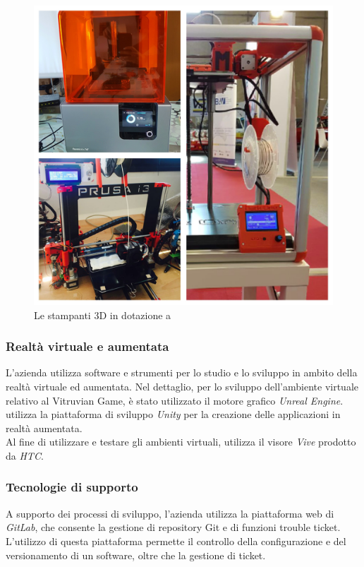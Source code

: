 \begin{figure}[H]
	\begin{center}
	\includegraphics[scale=0.07]{immagini/stampanti.jpg}
	\caption{Le stampanti 3D in dotazione a \lab{}}
	\end{center}
\end{figure}

\subsubsection{Realtà virtuale e aumentata}
L'azienda utilizza software e strumenti per lo studio e lo sviluppo in ambito della realtà virtuale ed aumentata.
Nel dettaglio, per lo sviluppo dell'ambiente virtuale relativo al Vitruvian Game, è stato utilizzato il motore grafico \textit{Unreal Engine}.\\
\lab{} utilizza la piattaforma di sviluppo \textit{Unity} per la creazione delle applicazioni in realtà aumentata.\\
Al fine di utilizzare e testare gli ambienti virtuali, \lab{} utilizza il visore \textit{Vive} prodotto da \textit{HTC}.

\subsubsection{Tecnologie di supporto}
A supporto dei processi di sviluppo, l'azienda utilizza la piattaforma web di \textit{GitLab}, che consente la gestione di repository Git e di funzioni trouble ticket.\\
L'utilizzo di questa piattaforma permette il controllo della configurazione e del versionamento di un software, oltre che la gestione di ticket.

